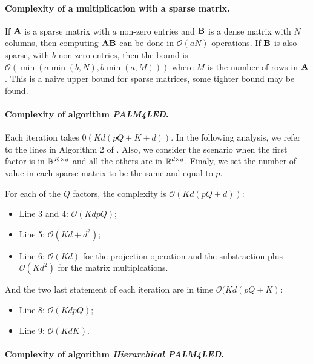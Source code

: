 \paragraph{Complexity of a multiplication with a sparse matrix.}
If ${\mathbf{A}}$ is a sparse matrix with $a$ non-zero entries and ${\mathbf{B}}$ is a dense matrix with $N$ columns, then computing ${\mathbf{A}} {\mathbf{B}}$ can be done in $\mathcal{O}\left (aN\right )$ operations.
If ${\mathbf{B}}$ is also sparse, with $b$ non-zero entries, then the bound is $\mathcal{O}\left ( \min\left ( a \min\left (b, N \right ), b \min\left (a, M\right ) \right ) \right )$ where $M$ is the number of rows in ${\mathbf{A}}$.
This is a naive upper bound for sparse matrices, some tighter bound may be found.

\paragraph{Complexity of algorithm \textit{PALM4LED}.}
Each iteration takes $\mathcal{0}(Kd(pQ+K+d))$. In the following analysis, we refer to the lines in Algorithm 2 of \cite{magoarou2014learning}. Also, we consider the scenario when the first factor is in $\mathbb{R}^{K \times d}$ and all the others are in $\mathbb{R}^{d \times d}$. Finaly, we set the number of value in each sparse matrix to be the same and equal to $p$.

For each of the $Q$ factors, the complexity is $\mathcal{O}(Kd(pQ + d))$:

\begin{itemize}
 \item Line 3 and 4: $\mathcal{O}(KdpQ)$;
 \item Line 5: $\mathcal{O}(Kd + d^2)$;
 \item Line 6: $\mathcal{O}(Kd)$ for the projection operation and the substraction plus $\mathcal{O}(Kd^2)$ for the matrix multiplcations.
\end{itemize}

And the two last statement of each iteration are in time $\mathcal{O}(Kd(pQ + K)$:

\begin{itemize}
 \item Line 8: $\mathcal{O}(KdpQ)$;
 \item Line 9: $\mathcal{O}(KdK)$.
\end{itemize}

\paragraph{Complexity of algorithm \textit{Hierarchical PALM4LED}.}

